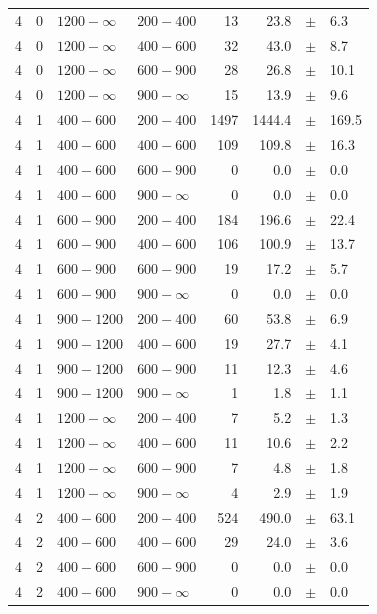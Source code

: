 \begin{table}[!h]
\begin{tabular}{rrllrrcl}
4 & 0 & $1200- \infty$ & $200-400$ &     13 &     23.8 &$\pm$&    6.3 \\
4 & 0 & $1200- \infty$ & $400-600$ &     32 &     43.0 &$\pm$&    8.7 \\
4 & 0 & $1200- \infty$ & $600-900$ &     28 &     26.8 &$\pm$&   10.1 \\
4 & 0 & $1200- \infty$ & $900-\infty$ &     15 &     13.9 &$\pm$&    9.6 \\
4 & 1 & $ 400- 600$ & $200-400$ &   1497 &   1444.4 &$\pm$&  169.5 \\
4 & 1 & $ 400- 600$ & $400-600$ &    109 &    109.8 &$\pm$&   16.3 \\
4 & 1 & $ 400- 600$ & $600-900$ &      0 &      0.0 &$\pm$&    0.0 \\
4 & 1 & $ 400- 600$ & $900-\infty$ &      0 &      0.0 &$\pm$&    0.0 \\
4 & 1 & $ 600- 900$ & $200-400$ &    184 &    196.6 &$\pm$&   22.4 \\
4 & 1 & $ 600- 900$ & $400-600$ &    106 &    100.9 &$\pm$&   13.7 \\
4 & 1 & $ 600- 900$ & $600-900$ &     19 &     17.2 &$\pm$&    5.7 \\
4 & 1 & $ 600- 900$ & $900-\infty$ &      0 &      0.0 &$\pm$&    0.0 \\
4 & 1 & $ 900-1200$ & $200-400$ &     60 &     53.8 &$\pm$&    6.9 \\
4 & 1 & $ 900-1200$ & $400-600$ &     19 &     27.7 &$\pm$&    4.1 \\
4 & 1 & $ 900-1200$ & $600-900$ &     11 &     12.3 &$\pm$&    4.6 \\
4 & 1 & $ 900-1200$ & $900-\infty$ &      1 &      1.8 &$\pm$&    1.1 \\
4 & 1 & $1200- \infty$ & $200-400$ &      7 &      5.2 &$\pm$&    1.3 \\
4 & 1 & $1200- \infty$ & $400-600$ &     11 &     10.6 &$\pm$&    2.2 \\
4 & 1 & $1200- \infty$ & $600-900$ &      7 &      4.8 &$\pm$&    1.8 \\
4 & 1 & $1200- \infty$ & $900-\infty$ &      4 &      2.9 &$\pm$&    1.9 \\
4 & 2 & $ 400- 600$ & $200-400$ &    524 &    490.0 &$\pm$&   63.1 \\
4 & 2 & $ 400- 600$ & $400-600$ &     29 &     24.0 &$\pm$&    3.6 \\
4 & 2 & $ 400- 600$ & $600-900$ &      0 &      0.0 &$\pm$&    0.0 \\
4 & 2 & $ 400- 600$ & $900-\infty$ &      0 &      0.0 &$\pm$&    0.0 \\

\end{tabular}
\end{table}
